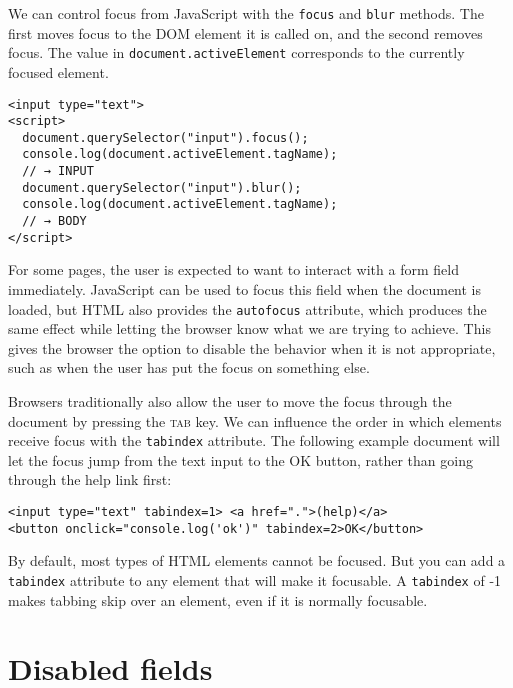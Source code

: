 We can control focus from JavaScript with the \lstinline`focus` and \lstinline`blur` methods. The first moves focus to the DOM element it is called on, and the second removes focus. The value in \lstinline`document.activeElement` corresponds to the currently focused element.

\begin{lstlisting}
<input type="text">
<script>
  document.querySelector("input").focus();
  console.log(document.activeElement.tagName);
  // → INPUT
  document.querySelector("input").blur();
  console.log(document.activeElement.tagName);
  // → BODY
</script>
\end{lstlisting}
\noindent{}

For some pages, the user is expected to want to interact with a form field immediately. JavaScript can be used to focus this field when the document is loaded, but HTML also provides the \lstinline`autofocus` attribute, which produces the same effect while letting the browser know what we are trying to achieve. This gives the browser the option to disable the behavior when it is not appropriate, such as when the user has put the focus on something else.

Browsers traditionally also allow the user to move the focus through the document by pressing the \textsc{tab} key. We can influence the order in which elements receive focus with the \lstinline`tabindex` attribute. The following example document will let the focus jump from the text input to the OK button, rather than going through the help link first:

\begin{lstlisting}
<input type="text" tabindex=1> <a href=".">(help)</a>
<button onclick="console.log('ok')" tabindex=2>OK</button>
\end{lstlisting}
\noindent{}

By default, most types of HTML elements cannot be focused. But you can add a \lstinline`tabindex` attribute to any element that will make it focusable. A \lstinline`tabindex` of -1 makes tabbing skip over an element, even if it is normally focusable.

\section{Disabled fields}

